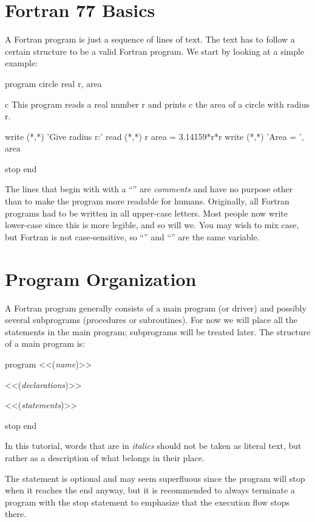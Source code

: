 \section{Fortran 77 Basics}

A Fortran program is just a sequence of lines of text. The text has to
follow a certain structure to be a valid Fortran program. We start by
looking at a simple example:

\begin{fssl}
      program circle
      real r, area

c This program reads a real number r and prints
c the area of a circle with radius r.

      write (*,*) 'Give radius r:'
      read  (*,*) r
      area = 3.14159*r*r
      write (*,*) 'Area = ', area

      stop
      end
\end{fssl}

The lines that begin with with a ``'' are \textit{comments} and
have no purpose other than to make the program more readable for humans.
Originally, all Fortran programs had to be written in all upper-case
letters. Most people now write lower-case since this is more legible,
and so will we. You may wish to mix case, but Fortran is not
case-sensitive, so ``'' and ``'' are the same variable.


\section*{Program Organization}

A Fortran program generally consists of a main program (or driver) and
possibly several subprograms (procedures or subroutines). For now we
will place all the statements in the main program; subprograms will be
treated later. The structure of a main program is:

\begin{fssl}
      program <<(\textit{name})>>

      <<(\textit{declarations})>>

      <<(\textit{statements})>>

      stop
      end
\end{fssl}


In this tutorial, words that are in \textit{italics} should not be taken
as literal text, but rather as a description of what belongs in their
place.

The  statement is optional and may seem superfluous since the
program will stop when it reaches the end anyway, but it is recommended
to always terminate a program with the stop statement to emphasize that
the execution flow stops there.

